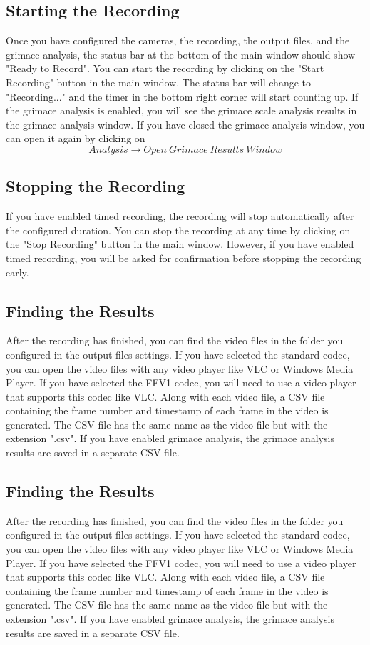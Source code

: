 \subsection{Starting the Recording}
Once you have configured the cameras, the recording, the output files, and the grimace analysis, 
the status bar at the bottom of the main window should show "Ready to Record".
You can start the recording by clicking on the "Start Recording" button in the main window.
The status bar will change to "Recording..." and the timer in the bottom right corner will start counting up.  
If the grimace analysis is enabled, you will see the grimace scale analysis results in the grimace analysis window.  
If you have closed the grimace analysis window, 
you can open it again by clicking on \[Analysis \rightarrow Open\ Grimace\ Results\ Window\]

\subsection{Stopping the Recording}
If you have enabled timed recording, the recording will stop automatically after the configured duration.
You can stop the recording at any time by clicking on the "Stop Recording" button in the main window. 
However, if you have enabled timed recording, you will be asked for confirmation before stopping the recording early.

\subsection{Finding the Results}
After the recording has finished, you can find the video files in the folder you configured in the output files settings.  
If you have selected the standard codec, you can open the video files with any video player like VLC or Windows Media Player.
If you have selected the FFV1 codec, you will need to use a video player that supports this codec like VLC.
Along with each video file, a CSV file containing the frame number and timestamp of each frame in the video is generated. 
The CSV file has the same name as the video file but with the extension ".csv".
If you have enabled grimace analysis, the grimace analysis results are saved in a separate CSV file.

\subsection{Finding the Results}
After the recording has finished, you can find the video files in the folder you configured in the output files settings.
If you have selected the standard codec, you can open the video files with any video player like VLC or Windows Media Player.
If you have selected the FFV1 codec, you will need to use a video player that supports this codec like VLC.
Along with each video file, a CSV file containing the frame number and timestamp of each frame in the video is generated.
The CSV file has the same name as the video file but with the extension ".csv".
If you have enabled grimace analysis, the grimace analysis results are saved in a separate CSV file.
